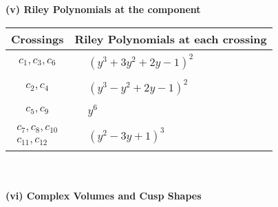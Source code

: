 \documentclass[1p]{elsarticle_modified}
\theoremstyle{definition}
\begin{document}
\newpage\renewcommand{\arraystretch}{1}
\flushleft \textbf{(v) Riley Polynomials at the component}\newline \\
\begin{tabular}{m{50pt}|m{274pt}}
Crossings & \hspace{64pt}Riley Polynomials at each crossing \\
\hline $$\begin{aligned}c_{1},c_{3},c_{6}\end{aligned}$$&$\begin{aligned}
&(y^3+3 y^2+2 y-1)^2
\end{aligned}$\\
\hline $$\begin{aligned}c_{2},c_{4}\end{aligned}$$&$\begin{aligned}
&(y^3- y^2+2 y-1)^2
\end{aligned}$\\
\hline $$\begin{aligned}c_{5},c_{9}\end{aligned}$$&$\begin{aligned}
&y^6
\end{aligned}$\\
\hline $$\begin{aligned}c_{7},c_{8},c_{10}\\c_{11},c_{12}\end{aligned}$$&$\begin{aligned}
&(y^2-3 y+1)^3
\end{aligned}$\\
\hline
\end{tabular}\\~\\
\newpage\flushleft \textbf{(vi) Complex Volumes and Cusp Shapes}
\end{document}
